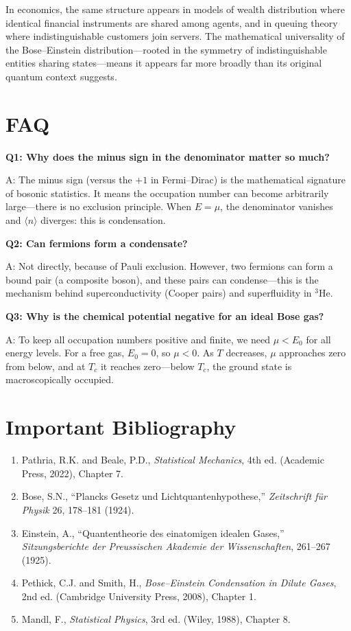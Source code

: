 \documentclass[11pt,openright]{book}
\begin{document}
In economics, the same structure appears in models of wealth distribution where identical financial instruments are shared among agents, and in queuing theory where indistinguishable customers join servers. The mathematical universality of the Bose--Einstein distribution---rooted in the symmetry of indistinguishable entities sharing states---means it appears far more broadly than its original quantum context suggests.


\section*{FAQ}

\textbf{Q1: Why does the minus sign in the denominator matter so much?}

A: The minus sign (versus the $+1$ in Fermi--Dirac) is the mathematical signature of bosonic statistics. It means the occupation number can become arbitrarily large---there is no exclusion principle. When $E = \mu$, the denominator vanishes and $\langle n \rangle$ diverges: this is condensation.

\textbf{Q2: Can fermions form a condensate?}

A: Not directly, because of Pauli exclusion. However, two fermions can form a bound pair (a composite boson), and these pairs can condense---this is the mechanism behind superconductivity (Cooper pairs) and superfluidity in $^3$He.

\textbf{Q3: Why is the chemical potential negative for an ideal Bose gas?}

A: To keep all occupation numbers positive and finite, we need $\mu < E_0$ for all energy levels. For a free gas, $E_0 = 0$, so $\mu < 0$. As $T$ decreases, $\mu$ approaches zero from below, and at $T_c$ it reaches zero---below $T_c$, the ground state is macroscopically occupied.
\section*{Important Bibliography}

\begin{enumerate}
\item Pathria, R.K. and Beale, P.D., \textit{Statistical Mechanics}, 4th ed. (Academic Press, 2022), Chapter 7.
\item Bose, S.N., ``Plancks Gesetz und Lichtquantenhypothese,'' \textit{Zeitschrift f\"ur Physik} 26, 178--181 (1924).
\item Einstein, A., ``Quantentheorie des einatomigen idealen Gases,'' \textit{Sitzungsberichte der Preussischen Akademie der Wissenschaften}, 261--267 (1925).
\item Pethick, C.J. and Smith, H., \textit{Bose--Einstein Condensation in Dilute Gases}, 2nd ed. (Cambridge University Press, 2008), Chapter 1.
\item Mandl, F., \textit{Statistical Physics}, 3rd ed. (Wiley, 1988), Chapter 8.
\end{enumerate}
\end{document}
